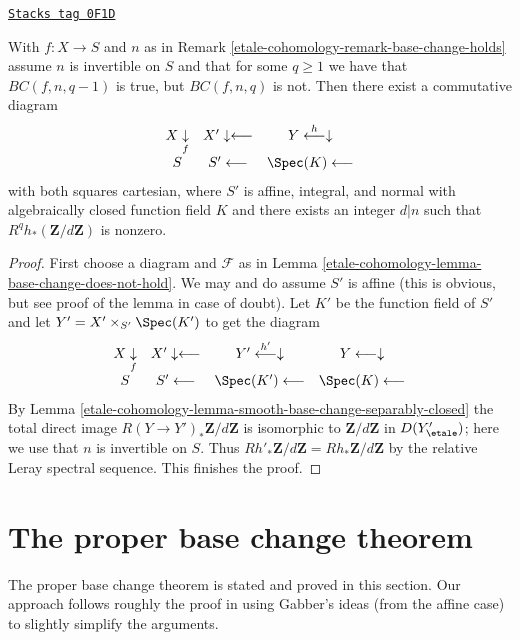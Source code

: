 \begin{lemma}
\label{etale-cohomology-lemma-base-change-does-not-hold-post}
\href{https://stacks.math.columbia.edu/tag/0F1D}{\texttt{Stacks tag 0F1D}}

With $f : X \to S$ and $n$ as in Remark \ref{etale-cohomology-remark-base-change-holds}
assume $n$ is invertible on $S$ and that for some $q \geq 1$
we have that $BC(f, n, q - 1)$ is true, but $BC(f, n, q)$ is not.
Then there exist a commutative diagram
$$
\begin{array}{ccc}X \underset{f}{\downarrow} & X' \downarrow\longleftarrow & Y \overset{h}{\longleftarrow}\downarrow \\ S & S' \longleftarrow & \Spec(K) \longleftarrow\end{array}
$$
with both squares cartesian, where $S'$ is affine, integral, and normal
with algebraically closed function field $K$ and there exists an integer
$d | n$ such that $R^qh_*(\mathbf{Z}/d\mathbf{Z})$ is nonzero.
\end{lemma}

\begin{proof}
First choose a diagram and $\mathcal{F}$ as in
Lemma \ref{etale-cohomology-lemma-base-change-does-not-hold}.
We may and do assume $S'$ is affine (this is obvious, but
see proof of the lemma in case of doubt).
Let $K'$ be the function field of $S'$
and let $Y' = X' \times_{S'} \Spec(K')$ to get the diagram
$$
\begin{array}{cccc}X \underset{f}{\downarrow} & X' \downarrow\longleftarrow & Y' \overset{h'}{\longleftarrow}\downarrow & Y \longleftarrow\downarrow \\ S & S' \longleftarrow & \Spec(K') \longleftarrow & \Spec(K) \longleftarrow\end{array}
$$
By Lemma \ref{etale-cohomology-lemma-smooth-base-change-separably-closed}
the total direct image $R(Y \to Y')_*\mathbf{Z}/d\mathbf{Z}$
is isomorphic to $\mathbf{Z}/d\mathbf{Z}$ in $D(Y'_\etale)$; here
we use that $n$ is invertible on $S$.
Thus $Rh'_*\mathbf{Z}/d\mathbf{Z} = Rh_*\mathbf{Z}/d\mathbf{Z}$
by the relative Leray spectral sequence. This finishes the proof.
\end{proof}

\section{The proper base change theorem}
\label{etale-cohomology-section-proper-base-change}
The proper base change theorem is stated and proved in this section.
Our approach follows roughly the proof in \cite[XII, Theorem 5.1]{SGA4}
using Gabber's ideas (from the affine case) to slightly simplify
the arguments.

